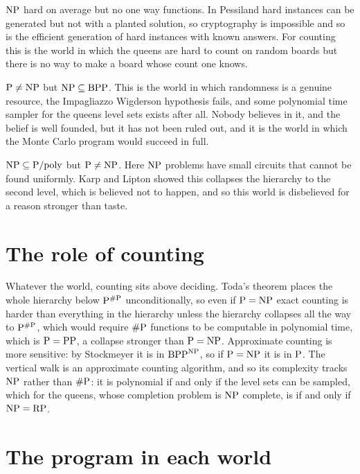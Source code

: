 $\mathrm{NP}$ hard on average but no one way functions. In Pessiland hard instances can be generated but not with a planted solution, so cryptography is impossible and so is the efficient generation of hard instances with known answers. For counting this is the world in which the queens are hard to count on random boards but there is no way to make a board whose count one knows.

$\mathrm{P} \neq \mathrm{NP}$ but $\mathrm{NP} \subseteq \mathrm{BPP}$. This is the world in which randomness is a genuine resource, the Impagliazzo Wigderson hypothesis fails, and some polynomial time sampler for the queens level sets exists after all. Nobody believes in it, and the belief is well founded, but it has not been ruled out, and it is the world in which the Monte Carlo program would succeed in full.

$\mathrm{NP} \subseteq \mathrm{P}/\mathrm{poly}$ but $\mathrm{P} \neq \mathrm{NP}$. Here $\mathrm{NP}$ problems have small circuits that cannot be found uniformly. Karp and Lipton showed this collapses the hierarchy to the second level, which is believed not to happen, and so this world is disbelieved for a reason stronger than taste.

\section{The role of counting}

Whatever the world, counting sits above deciding. Toda's theorem places the whole hierarchy below $\mathrm{P}^{\#\mathrm{P}}$ unconditionally, so even if $\mathrm{P} = \mathrm{NP}$ exact counting is harder than everything in the hierarchy unless the hierarchy collapses all the way to $\mathrm{P}^{\#\mathrm{P}}$, which would require $\#\mathrm{P}$ functions to be computable in polynomial time, which is $\mathrm{P} = \mathrm{PP}$, a collapse stronger than $\mathrm{P} = \mathrm{NP}$. Approximate counting is more sensitive: by Stockmeyer it is in $\mathrm{BPP}^{\mathrm{NP}}$, so if $\mathrm{P} = \mathrm{NP}$ it is in $\mathrm{P}$. The vertical walk is an approximate counting algorithm, and so its complexity tracks $\mathrm{NP}$ rather than $\#\mathrm{P}$: it is polynomial if and only if the level sets can be sampled, which for the queens, whose completion problem is $\mathrm{NP}$ complete, is if and only if $\mathrm{NP} = \mathrm{RP}$.

\section{The program in each world}

